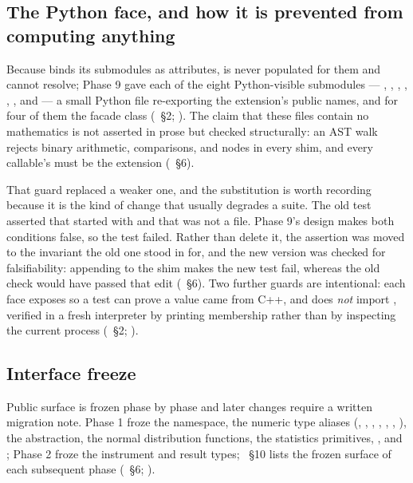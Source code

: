 \documentclass[11pt,a4paper]{article}
\begin{document}
\subsection{The Python face, and how it is prevented from computing anything}
Because  binds its submodules as attributes,  is never
populated for them and  cannot resolve; Phase 9 gave each of
the eight Python-visible submodules --- , , ,
, , ,  and  --- a small
Python file re-exporting the extension's public names, and for four of them the facade class
(~\S2; ). The claim that these
files contain no mathematics is not asserted in prose but checked structurally: an AST walk
rejects binary arithmetic, comparisons,  and  nodes in every shim, and
every callable's  must be the extension
(~\S6).

That guard replaced a weaker one, and the substitution is worth recording because it is the
kind of change that usually degrades a suite. The old test asserted that
 started with  and that
 was not a  file. Phase 9's design makes both conditions false,
so the test failed. Rather than delete it, the assertion was moved to the invariant the old
one stood in for, and the new version was checked for falsifiability: appending
 to the shim makes the new test fail, whereas the old
 check would have passed that edit
(~\S6). Two further guards are intentional:
each face exposes  so a test can prove a value came from C++, and
 does \emph{not} import , verified in a fresh
interpreter by printing  membership rather than by inspecting the current
process (~\S2;
).

\subsection{Interface freeze}
Public surface is frozen phase by phase and later changes require a written migration note.
Phase 1 froze the namespace, the numeric type aliases (, ,
, , , , ), the 
abstraction, the normal distribution functions, the statistics primitives,
,  and ; Phase 2 froze the
instrument and result types; ~\S10 lists the frozen surface of each
subsequent phase (~\S6;
).
\end{document}
